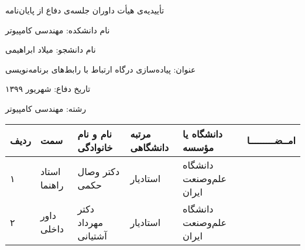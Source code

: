 \newpage
\thispagestyle{empty}

\begin{center}
{\Large
    تأییدیه‌ی هیأت داوران جلسه‌ی دفاع از پایان‌نامه
}
\end{center}
\vspace{1cm}

نام دانشكده: مهندسی کامپیوتر

نام دانشجو: میلاد ابراهیمی

عنوان: پیاده‌سازی درگاه ارتباط با رابط‌های برنامه‌نویسی

تاریخ دفاع: شهریور ۱۳۹۹

رشته: مهندسی کامپیوتر \\[50pt]
\begin{center}
    \begin{tabular}{| p{8mm} | p{18mm} | p{} |p{14mm}|p{}|c|}
        \hline
        ردیف & سمت & نام و نام خانوادگی & مرتبه دانشگاهی & دانشگاه یا مؤسسه & امــضـــــــــا\\
        \hline
        ۱ & استاد راهنما & دکتر \newline وصال حکمی & استادیار & دانشگاه علم‌و‌صنعت ایران &    \\
        \hline
        ۲ & داور داخلی & دکتر \newline مهرداد آشتیانی & استادیار & دانشگاه علم‌و‌صنعت ایران   &     \\
        \hline


    \end{tabular}
\end{center}


\cleardoublepage 